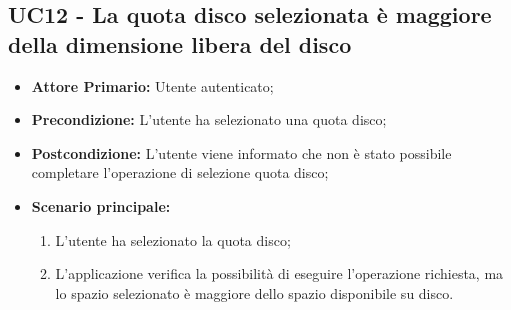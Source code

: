 \subsection{UC12 - La quota disco selezionata è maggiore della dimensione libera del disco}
\label{UC12}
\begin{itemize}
\item \textbf{Attore Primario:} Utente autenticato;
\item \textbf{Precondizione:} L'utente ha selezionato una quota disco;
\item \textbf{Postcondizione:} L'utente viene informato che non è stato possibile completare l'operazione di selezione quota disco;
\item \textbf{Scenario principale:}
    \begin{enumerate}
    \item L'utente ha selezionato la quota disco;
    \item L'applicazione verifica la possibilità di eseguire l'operazione richiesta, ma lo spazio selezionato è maggiore dello spazio disponibile su disco.
    \end{enumerate}
\end{itemize}